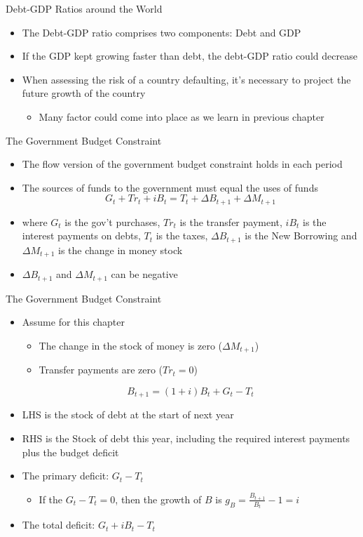 \documentclass[aspectratio=1610]{beamer}
\begin{document}
\begin{frame}[wide]{Debt-GDP Ratios around the World}
	\begin{itemize}
		\item The Debt-GDP ratio comprises two components: Debt and GDP
		\item If the GDP kept growing faster than debt, the debt-GDP ratio could decrease
		\item When assessing the risk of a country defaulting, it's necessary to project the future growth of the country
		\begin{itemize}
			\item Many factor could come into place as we learn in previous chapter
		\end{itemize}
	\end{itemize}

\end{frame}

\begin{frame}[wide]{The Government Budget Constraint}
	\begin{itemize}
		\item The flow version of the government budget constraint holds in each period
		\item The sources of funds to the government must equal the uses of funds
		\[G_t + Tr_t + iB_t = T_t + \Delta B_{t+1} + \Delta M_{t+1}\]
		\item[] where $G_t$ is the gov't purchases, $Tr_t$ is the transfer payment, $iB_t$ is the interest payments on debts, $T_t$ is the taxes, $\Delta B_{t+1}$ is the New Borrowing and $\Delta M_{t+1}$ is the change in money stock
		\item $\Delta B_{t+1}$ and $\Delta M_{t+1}$ can be negative
	\end{itemize}
\end{frame}

\begin{frame}[wide]{The Government Budget Constraint}
	\begin{itemize}
		\item Assume for this chapter
		\begin{itemize}
			\item The change in the stock of money is zero ($\Delta M_{t+1}$)
			\item Transfer payments are zero ($Tr_t = 0$)
		\end{itemize}
		\[B_{t+1} = (1+i) B_t + G_t -T_t\]
		\item LHS is the stock of debt at the start of next year 
		\item RHS is the Stock of debt this year, including the required interest payments plus the budget deficit
		\item The primary deficit: $G_t - T_t$
		\begin{itemize}
			\item If the $G_t-T_t=0$, then the growth of $B$ is $g_B = \frac{B_{t+1}}{B_t} - 1 = i$
		\end{itemize}
		\item The total deficit: $G_t +iB_t -T_t$		
	\end{itemize}
\end{frame}
\end{document}
